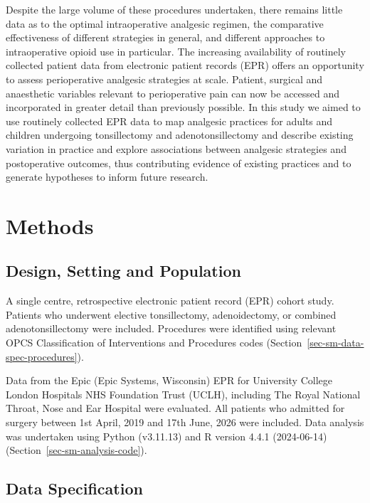 \documentclass[
  letterpaper,
  DIV=11,
  numbers=noendperiod]{scrreprt}
\begin{document}
Despite the large volume of these procedures undertaken, there remains
little data as to the optimal intraoperative analgesic regimen, the
comparative effectiveness of different strategies in general, and
different approaches to intraoperative opioid use in particular. The
increasing availability of routinely collected patient data from
electronic patient records (EPR) offers an opportunity to assess
perioperative analgesic strategies at scale. Patient, surgical and
anaesthetic variables relevant to perioperative pain can now be accessed
and incorporated in greater detail than previously possible. In this
study we aimed to use routinely collected EPR data to map analgesic
practices for adults and children undergoing tonsillectomy and
adenotonsillectomy and describe existing variation in practice and
explore associations between analgesic strategies and postoperative
outcomes, thus contributing evidence of existing practices and to
generate hypotheses to inform future research.

\section{Methods}\label{methods-1}

\subsection{Design, Setting and
Population}\label{design-setting-and-population}

A single centre, retrospective electronic patient record (EPR) cohort
study. Patients who underwent elective tonsillectomy, adenoidectomy, or
combined adenotonsillectomy were included. Procedures were identified
using relevant OPCS Classification of Interventions and Procedures codes
(Section~\ref{sec-sm-data-spec-procedures}).

Data from the Epic (Epic Systems, Wisconsin) EPR for University College
London Hospitals NHS Foundation Trust (UCLH), including The Royal
National Throat, Nose and Ear Hospital were evaluated. All patients who
admitted for surgery between 1st April, 2019 and 17th June, 2026 were
included. Data analysis was undertaken using Python (v3.11.13) and R
version 4.4.1 (2024-06-14) (Section~\ref{sec-sm-analysis-code}).

\subsection{Data Specification}\label{data-specification}
\end{document}
